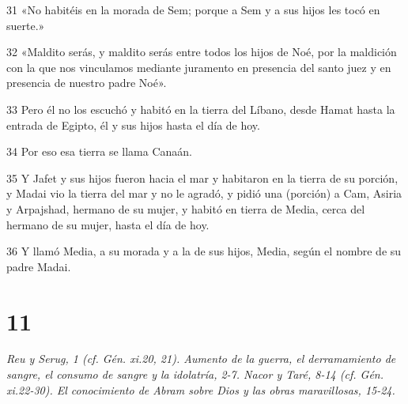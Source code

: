 \par 31 «No habitéis en la morada de Sem; porque a Sem y a sus hijos les tocó en suerte.»
\par 32 «Maldito serás, y maldito serás entre todos los hijos de Noé, por la maldición con la que nos vinculamos mediante juramento en presencia del santo juez y en presencia de nuestro padre Noé».
\par 33 Pero él no los escuchó y habitó en la tierra del Líbano, desde Hamat hasta la entrada de Egipto, él y sus hijos hasta el día de hoy.
\par 34 Por eso esa tierra se llama Canaán.
\par 35 Y Jafet y sus hijos fueron hacia el mar y habitaron en la tierra de su porción, y Madai vio la tierra del mar y no le agradó, y pidió una (porción) a Cam, Asiria y Arpajshad, hermano de su mujer, y habitó en tierra de Media, cerca del hermano de su mujer, hasta el día de hoy.
\par 36 Y llamó Media, a su morada y a la de sus hijos, Media, según el nombre de su padre Madai.

\chapter{11}

\par \textit{Reu y Serug, 1 (cf. Gén. xi.20, 21). Aumento de la guerra, el derramamiento de sangre, el consumo de sangre y la idolatría, 2-7. Nacor y Taré, 8-14 (cf. Gén. xi.22-30). El conocimiento de Abram sobre Dios y las obras maravillosas, 15-24.}


